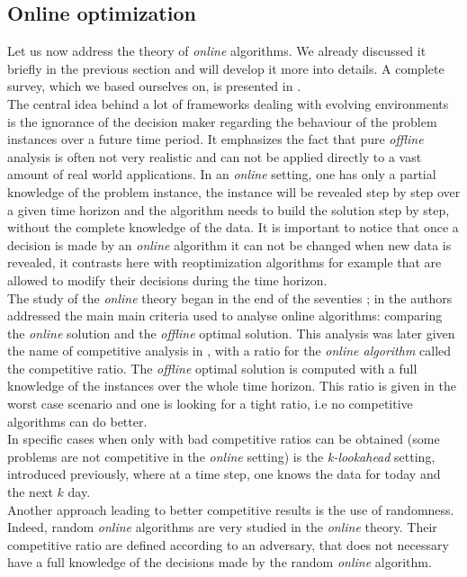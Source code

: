 \documentclass[a4paper]{book}
\begin{document}
\subsection{Online optimization}
Let us now address the theory of \emph{online} algorithms. We already discussed it briefly in the previous section and will develop it more into details. A complete survey, which we based ourselves on, is presented in \cite{albers1997ptima}.\\
The central idea behind a lot of frameworks dealing with evolving environments is the ignorance of the decision maker regarding the behaviour of the problem instances over a future time period. It emphasizes the fact that pure \emph{offline} analysis is often not very realistic and can not be applied directly to a vast amount of real world applications. In an \emph{online} setting, one has only a partial knowledge of the problem instance, the instance will be revealed step by step over a given time horizon and the algorithm needs to build the solution step by step, without the complete knowledge of the data. It is important to notice that once a decision is made by an \emph{online} algorithm it can not be changed when new data is revealed, it contrasts here with reoptimization algorithms for example that are allowed to modify their decisions during the time horizon. \\
The study of the \emph{online} theory began in the end of the seventies ; in \cite{SleatorT85} the authors addressed the main main criteria used to analyse online algorithms: comparing the \emph{online} solution and the \emph{offline} optimal solution. This analysis was later given the name of competitive analysis in \cite{KarlinMRS88}, with a ratio for the \emph{online algorithm} called the competitive ratio. The \emph{offline} optimal solution is computed with a full knowledge of the instances over the whole time horizon. This ratio is given in the worst case scenario and one is looking for a tight ratio, i.e no competitive algorithms can do better.\\
In specific cases when only with bad competitive ratios can be obtained (some problems are not competitive in the \emph{online} setting) is the \emph{k-lookahead} setting, introduced previously, where at a time step, one knows the data for today and the next $k$ day.\\
Another approach leading to better competitive results is the use of randomness. Indeed, random \emph{online} algorithms are very studied in the \emph{online} theory. Their competitive ratio are defined according to an adversary, that does not necessary have a full knowledge of the decisions made by the random \emph{online} algorithm.\\
\end{document}
